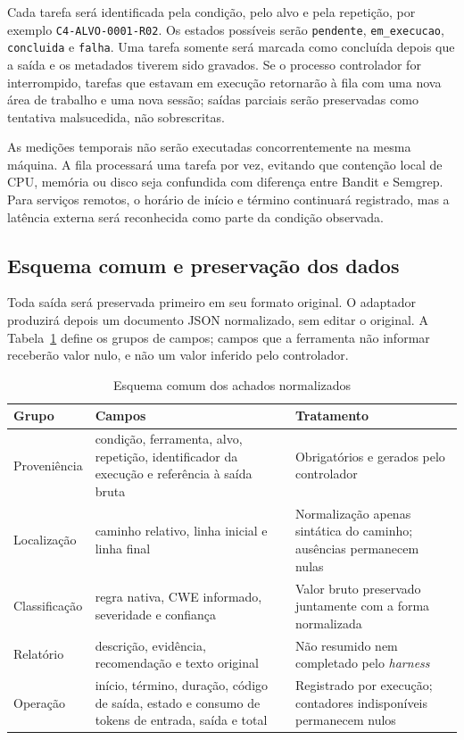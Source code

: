 Cada tarefa será identificada pela condição, pelo alvo e pela repetição, por exemplo \texttt{C4-ALVO-0001-R02}. Os estados possíveis serão \texttt{pendente}, \texttt{em\_execucao}, \texttt{concluida} e \texttt{falha}. Uma tarefa somente será marcada como concluída depois que a saída e os metadados tiverem sido gravados. Se o processo controlador for interrompido, tarefas que estavam em execução retornarão à fila com uma nova área de trabalho e uma nova sessão; saídas parciais serão preservadas como tentativa malsucedida, não sobrescritas.

As medições temporais não serão executadas concorrentemente na mesma máquina. A fila processará uma tarefa por vez, evitando que contenção local de CPU, memória ou disco seja confundida com diferença entre Bandit e Semgrep. Para serviços remotos, o horário de início e término continuará registrado, mas a latência externa será reconhecida como parte da condição observada.

\subsection{Esquema comum e preservação dos dados}\label{subsec:esquema-comum-achados}

Toda saída será preservada primeiro em seu formato original. O adaptador produzirá depois um documento JSON normalizado, sem editar o original. A Tabela~\ref{tab:esquema-achado-comum} define os grupos de campos; campos que a ferramenta não informar receberão valor nulo, e não um valor inferido pelo controlador.

\begin{table}[htb]
\ABNTEXfontereduzida
\caption{\label{tab:esquema-achado-comum}Esquema comum dos achados normalizados}
\centering
\begin{tabularx}{\textwidth}{|l|X|X|}
\hline
\textbf{Grupo} & \textbf{Campos} & \textbf{Tratamento} \\
\hline
Proveniência & condição, ferramenta, alvo, repetição, identificador da execução e referência à saída bruta & Obrigatórios e gerados pelo controlador \\
\hline
Localização & caminho relativo, linha inicial e linha final & Normalização apenas sintática do caminho; ausências permanecem nulas \\
\hline
Classificação & regra nativa, CWE informado, severidade e confiança & Valor bruto preservado juntamente com a forma normalizada \\
\hline
Relatório & descrição, evidência, recomendação e texto original & Não resumido nem completado pelo \textit{harness} \\
\hline
Operação & início, término, duração, código de saída, estado e consumo de tokens de entrada, saída e total & Registrado por execução; contadores indisponíveis permanecem nulos \\
\hline
\end{tabularx}
\end{table}

